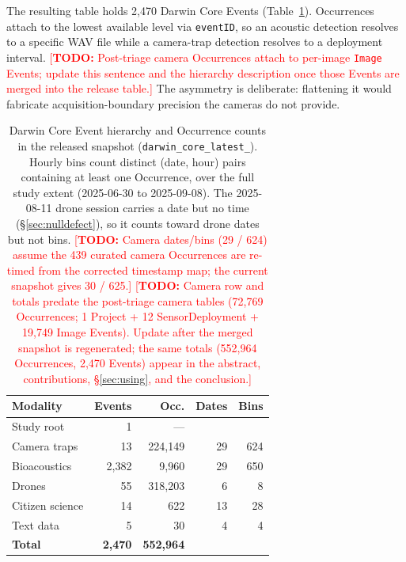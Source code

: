 \documentclass[sigconf]{acmart}
\newcommand{\TODO}[1]{\textcolor{red}{\footnotesize[\textbf{TODO:} #1]}}
\newcommand{\TODO}[1]{}
\begin{document}
The resulting table holds 2{,}470 Darwin Core Events
(Table~\ref{tab:schema}). Occurrences attach to the lowest available
level via \texttt{eventID}, so an acoustic detection resolves to a
specific WAV file while a camera-trap detection resolves to a deployment
interval.
\TODO{Post-triage camera Occurrences attach to per-image \texttt{Image}
Events; update this sentence and the hierarchy description once those
Events are merged into the release table.} The asymmetry is deliberate: flattening it would fabricate
acquisition-boundary precision the cameras do not provide.

\begin{table}[t]
\caption{Darwin Core Event hierarchy and Occurrence counts in the
released snapshot (\texttt{darwin\_core\_\allowbreak latest\_}). Hourly bins count
distinct (date, hour) pairs containing at least one Occurrence, over
the full study extent (2025-06-30 to 2025-09-08). The 2025-08-11 drone
session carries a date but no time (\S\ref{sec:nulldefect}), so it
counts toward drone dates but not bins.
\TODO{Camera dates/bins (29 / 624) assume the 439 curated camera
Occurrences are re-timed from the corrected timestamp map; the current
snapshot gives 30 / 625.}
\TODO{Camera row and totals predate the post-triage camera tables
(72{,}769 Occurrences; 1 Project + 12 SensorDeployment + 19{,}749
Image Events). Update after the merged snapshot is regenerated; the
same totals (552{,}964 Occurrences, 2{,}470 Events) appear in the
abstract, contributions, \S\ref{sec:using}, and the conclusion.}}
\label{tab:schema}
\small
\begin{tabular}{lrrrr}
\toprule
\textbf{Modality} & \textbf{Events} & \textbf{Occ.} & \textbf{Dates} & \textbf{Bins} \\
\midrule
Study root & 1 & --- & & \\
Camera traps & 13 & 224{,}149 & 29 & 624 \\
Bioacoustics & 2{,}382 & 9{,}960 & 29 & 650 \\
Drones & 55 & 318{,}203 & 6 & 8 \\
Citizen science & 14 & 622 & 13 & 28 \\
Text data & 5 & 30 & 4 & 4 \\
\midrule
\textbf{Total} & \textbf{2{,}470} & \textbf{552{,}964} & & \\
\bottomrule
\end{tabular}
\end{table}
\end{document}
